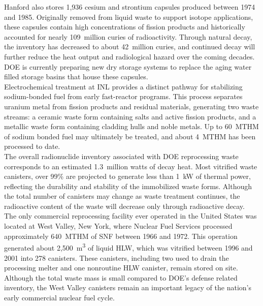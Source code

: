     Hanford also stores 1,936 cesium and strontium capsules produced between 1974 and 1985. Originally removed from liquid waste to
    support isotope applications, these capsules contain high concentrations of fission products and historically accounted for
    nearly 109~million curies of radioactivity. Through natural decay, the inventory has decreased to about 42~million curies,
    and continued decay will further reduce the heat output and radiological hazard over the coming decades. \gls{DOE} is currently
    preparing new dry storage systems to replace the aging water filled storage basins that house these capsules.\\

    Electrochemical treatment at \gls{INL} provides a distinct pathway for stabilizing sodium-bonded fuel from early fast-reactor programs.
    This process separates uranium metal from fission products and residual materials, generating two waste streams: a ceramic waste
    form containing salts and active fission products, and a metallic waste form containing cladding hulls and noble metals.
    Up to 60~\gls{MTHM} of sodium bonded fuel may ultimately be treated, and 
    about 4~\gls{MTHM} has been processed to date.\\

    The overall radionuclide inventory associated with \gls{DOE} reprocessing waste corresponds to an estimated 1.3~million watts of
    decay heat. Most vitrified waste canisters, over 99\% are projected to generate less than 1~kW of thermal power, reflecting the
    durability and stability of the immobilized waste forms. Although the total number of canisters may change as waste treatment
    continues, the radioactive content of the waste will decrease only through radioactive decay\cite{carter_spent_2023}.\\

    The only commercial reprocessing facility ever operated in the United States was located at West Valley,
    New York, where Nuclear Fuel Services processed approximately 
    640~\gls{MTHM} of \gls{SNF} between 1966 and 1972.
    This operation generated about 2,500~m\textsuperscript{3} of liquid \gls{HLW}, which was vitrified between 1996 and 2001 into
    278 canisters. These canisters, including two used to drain the processing melter and one nonroutine \gls{HLW} canister, remain
    stored on site. Although the total waste mass is small compared to \gls{DOE}'s defense related inventory, the West Valley canisters
    remain an important legacy of the nation's early commercial nuclear fuel cycle.

